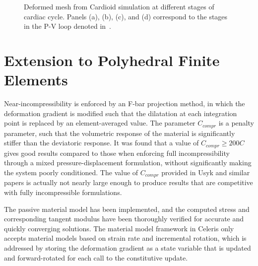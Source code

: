 \begin{figure}[ht!]
{\label{fig:snaps4}}		
%
\caption{Deformed mesh from Cardioid simulation at different stages of cardiac cycle. Panels (a), (b), (c), and (d) correspond to the stages in the P-V loop denoted in~.}
\label{fig:snaps}
\end{figure}

\section{Extension to Polyhedral Finite Elements}
\label{Polyhedral Finite Elements}

Near-incompressibility is enforced by an F-bar projection method, in which the deformation gradient is modified such that the dilatation at each integration point is replaced by an element-averaged value. The parameter $C_{compr}$ is a penalty parameter, such that the volumetric response of the material is significantly stiffer than the deviatoric response. It was found that a value of $C_{compr} \geq 200  C$ gives good results compared to those when enforcing full incompressibility through a mixed pressure-displacement formulation, without significantly making the system poorly conditioned. The value of $C_{compr}$ provided in Usyk and similar papers is actually not nearly large enough to produce results that are competitive with fully incompressible formulations.

The passive material model has been implemented, and the computed stress and corresponding tangent modulus have been thoroughly verified for accurate and quickly converging solutions. The material model framework in Celeris only accepts material models based on strain rate and incremental rotation, which is addressed by storing the deformation gradient as a state variable that is updated and forward-rotated for each call to the constitutive update.

